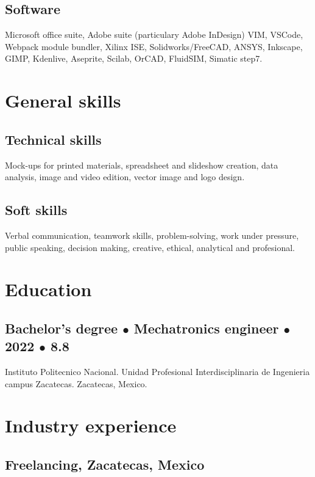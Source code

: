 \documentclass{article}
\begin{document}
    \subsection{Software}

    Microsoft office suite, Adobe suite (particulary Adobe InDesign) VIM, VSCode, Webpack module bundler, Xilinx ISE, Solidworks/FreeCAD, ANSYS, Inkscape, GIMP, Kdenlive, Aseprite, Scilab, OrCAD, FluidSIM, Simatic step7.


  \section{General skills}

  \subsection{Technical skills}
  Mock-ups for printed materials, spreadsheet and slideshow creation, data analysis, image and video edition, vector image and logo design.

  \subsection{Soft skills}
  Verbal communication, teamwork skills, problem-solving, work under pressure, public speaking, decision making, creative, ethical, analytical and profesional.%


  \section{Education}%

  \subsection{Bachelor's degree $\bullet$  Mechatronics engineer $\bullet$ 2022 $\bullet$ 8.8}
  Instituto Politecnico Nacional.
  Unidad Profesional Interdisciplinaria de Ingenieria campus Zacatecas.
  Zacatecas, Mexico.%


  \section{Industry experience}%

  \subsection{\textbf{Freelancing}, Zacatecas, Mexico}
\end{document}

